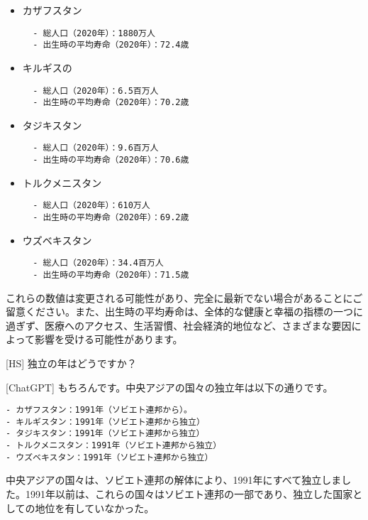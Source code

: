\documentclass[
]{bxjsbook}
\theoremstyle{definition}
\theoremstyle{definition}
\theoremstyle{definition}
\theoremstyle{definition}
\theoremstyle{remark}
\begin{document}
\begin{itemize}
\item
  カザフスタン

\begin{verbatim}
  - 総人口（2020年）：1880万人
  - 出生時の平均寿命（2020年）：72.4歳
\end{verbatim}
\item
  キルギスの

\begin{verbatim}
  - 総人口（2020年）：6.5百万人
  - 出生時の平均寿命（2020年）：70.2歳
\end{verbatim}
\item
  タジキスタン

\begin{verbatim}
  - 総人口（2020年）：9.6百万人
  - 出生時の平均寿命（2020年）：70.6歳
\end{verbatim}
\item
  トルクメニスタン

\begin{verbatim}
  - 総人口（2020年）：610万人
  - 出生時の平均寿命（2020年）：69.2歳
\end{verbatim}
\item
  ウズベキスタン

\begin{verbatim}
  - 総人口（2020年）：34.4百万人
  - 出生時の平均寿命（2020年）：71.5歳
\end{verbatim}
\end{itemize}

これらの数値は変更される可能性があり、完全に最新でない場合があることにご留意ください。また、出生時の平均寿命は、全体的な健康と幸福の指標の一つに過ぎず、医療へのアクセス、生活習慣、社会経済的地位など、さまざまな要因によって影響を受ける可能性があります。

{[}HS{]} 独立の年はどうですか？

{[}ChatGPT{]} もちろんです。中央アジアの国々の独立年は以下の通りです。

\begin{verbatim}
- カザフスタン：1991年（ソビエト連邦から）。
- キルギスタン：1991年（ソビエト連邦から独立）
- タジキスタン：1991年（ソビエト連邦から独立）
- トルクメニスタン：1991年（ソビエト連邦から独立）
- ウズベキスタン：1991年（ソビエト連邦から独立）
\end{verbatim}

中央アジアの国々は、ソビエト連邦の解体により、1991年にすべて独立しました。1991年以前は、これらの国々はソビエト連邦の一部であり、独立した国家としての地位を有していなかった。
\end{document}
